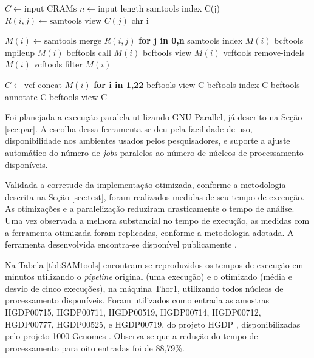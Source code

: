 \documentclass[cic,tc]{iiufrgs}
\begin{document}
\begin{algorithmic}
  \State $C \gets \text{input CRAMs}$
  \State $n \gets \text{input length}$
  \State samtools index C(j)
    \State $R(i,j) \gets \text{samtools view } C(j) \text{ chr i}$
  \EndFor
\EndFor

  \State $M(i) \gets \text{samtools merge } R(i,j)$ \textbf{for j in 0,n}
  \State samtools index $M(i)$
  \State bcftools mpileup $M(i)$
  \State bcftools call $M(i)$
  \State bcftools view $M(i)$
  \State vcftools remove-indels $M(i)$
  \State vcftools filter $M(i)$
\EndFor

\State $C \gets \text{vcf-concat } M(i)$ \textbf{for i in 1,22}
\State bcftools view C
\State bcftools index C
\State bcftools annotate C
\State bcftools view C
\end{algorithmic}

Foi planejada a execução paralela utilizando GNU Parallel, já descrito na Seção
\ref{sec:par}. A escolha dessa ferramenta se deu pela facilidade de uso,
disponibilidade nos ambientes usados pelos pesquisadores, e suporte a ajuste
automático do número de \textit{jobs} paralelos ao número de núcleos de
processamento disponíveis. 

Validada a corretude da implementação otimizada, conforme a metodologia
descrita na Seção \ref{sec:test}, foram realizados medidas de seu tempo de
execução. As otimizações e a paralelização reduziram drasticamente o tempo de
análise. Uma vez observada a melhora substancial no tempo de execução, as
medidas com a ferramenta otimizada foram replicadas, conforme a metodologia
adotada. A ferramenta desenvolvida encontra-se disponível publicamente \cite{parsnv}.

Na Tabela \ref{tbl:SAMtools} encontram-se reproduzidos os tempos de execução em
minutos utilizando o \textit{pipeline} original (uma execução) e o otimizado
(média e desvio de cinco execuções), na máquina Thor1, utilizando todos núcleos
de processamento disponíveis. Foram utilizados como entrada as amostras
HGDP00715, HGDP00711, HGDP00519, HGDP00714, HGDP00712, HGDP00777, HGDP00525, e
HGDP00719, do projeto HGDP \cite{cavalli2005human}, disponibilizadas pelo
projeto 1000 Genomes \cite{via20101000}. Observa-se que a redução do tempo de
processamento para oito entradas foi de 88,79\%.
\end{document}

